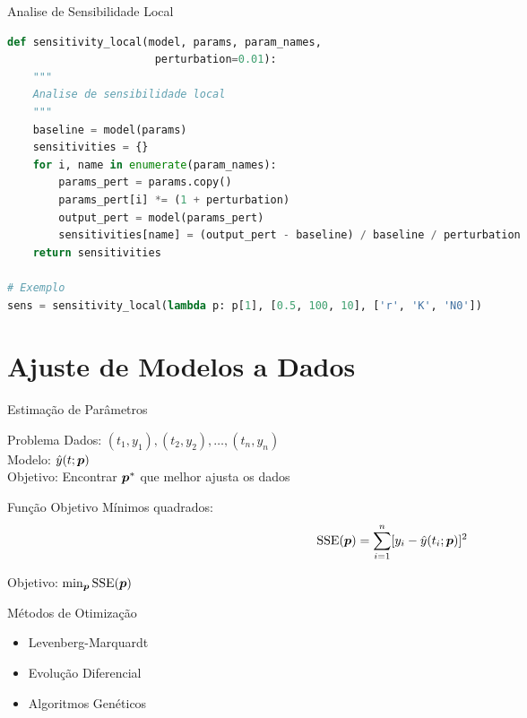\begin{frame}{Analise de Sensibilidade Local}
\begin{lstlisting}[language=Python, caption=Sensibilidade por diferenças finitas, basicstyle=\ttfamily\footnotesize]
def sensitivity_local(model, params, param_names,
                       perturbation=0.01):
    """
    Analise de sensibilidade local
    """
    baseline = model(params)
    sensitivities = {}
    for i, name in enumerate(param_names):
        params_pert = params.copy()
        params_pert[i] *= (1 + perturbation)
        output_pert = model(params_pert)
        sensitivities[name] = (output_pert - baseline) / baseline / perturbation
    return sensitivities

# Exemplo
sens = sensitivity_local(lambda p: p[1], [0.5, 100, 10], ['r', 'K', 'N0'])
\end{lstlisting}
\end{frame}

\section{Ajuste de Modelos a Dados}

\begin{frame}[allowframebreaks]{Estimação de Parâmetros}
\begin{block}{Problema}
Dados: $(t_1, y_1), (t_2, y_2), \ldots, (t_n, y_n)$\\
Modelo: $\hat{y}(t; \boldsymbol{p})$\\
Objetivo: Encontrar $\boldsymbol{p}^*$ que melhor ajusta os dados
\end{block}

\vspace{0.3cm}

\begin{block}{Função Objetivo}
Mínimos quadrados:
\begin{equation*}
\text{SSE}(\boldsymbol{p}) = \sum_{i=1}^{n} [y_i - \hat{y}(t_i; \boldsymbol{p})]^2
\end{equation*}

Objetivo: $\min_{\boldsymbol{p}} \text{SSE}(\boldsymbol{p})$
\end{block}

\begin{exampleblock}{Métodos de Otimização}
\begin{itemize}
    \item Levenberg-Marquardt
    \item Evolução Diferencial
    \item Algoritmos Genéticos
\end{itemize}
\end{exampleblock}
\end{frame}

